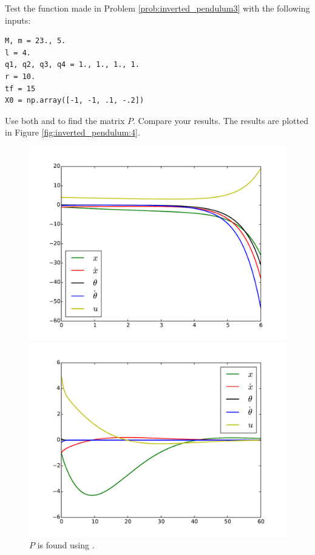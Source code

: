 \begin{problem}
Test the function made in Problem \eqref{prob:inverted_pendulum3} with the following inputs: 
\begin{lstlisting}
M, m = 23., 5.
l = 4.
q1, q2, q3, q4 = 1., 1., 1., 1.
r = 10.
tf = 15
X0 = np.array([-1, -1, .1, -.2])
\end{lstlisting}
Use both  and  to find the matrix $P$. Compare your results. The results are plotted in Figure \ref{fig:inverted_pendulum:4}.
\label{prob:inverted_pendulum:4}
\end{problem}


\begin{figure}
\begin{minipage}[b]{.47\linewidth}
\centering
\includegraphics[width=\textwidth]{prob4_unstable.pdf}
\caption*{$P$ is found using .}
\end{minipage}
\hspace{0.5cm}
\begin{minipage}[b]{0.47\linewidth}
\centering
\includegraphics[width=\textwidth]{prob4_stable.pdf}

\end{minipage}
\end{figure}
